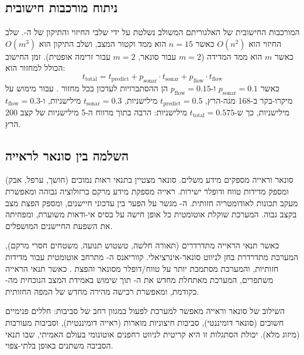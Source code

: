 \subsection{ניתוח מורכבות חישובית}
\label{sec:ch06_computational_complexity}

המורכבות החישובית של האלגוריתם המשולב נשלטת על ידי שלבי החיזוי והתיקון של ה-. שלב החיזוי הוא $O(n^2)$ כאשר $n=15$ הוא ממד וקטור המצב, ושלב התיקון הוא $O(m^3)$ כאשר $m$ הוא ממד המדידה ($m=2$ עבור סונאר, $m=2$ עבור זרימה אופטית). זמן החישוב הכולל למחזור הוא:
\begin{equation}
t_{\text{total}} = t_{\text{predict}} + p_{\text{sonar}} \cdot t_{\text{sonar}} + p_{\text{flow}} \cdot t_{\text{flow}}
\label{eq:ch06_computational_time}
\end{equation}
כאשר $p_{\text{sonar}} = 0.1$ ו-$p_{\text{flow}} = 0.15$ הן ההסתברויות לעדכון בכל מחזור . עבור מימוש על מיקרו-בקר  ב-168 מגה-הרץ, $t_{\text{predict}} = 0.5$ מילישניות, $t_{\text{sonar}} = 0.3$ מילישניות, ו-$t_{\text{flow}} = 0.3$ מילישניות, כך ש-$t_{\text{total}} = 0.575$ מילישניות: הרבה בתוך מרווח ה-5 מילישניות של קצב 200 הרץ.

\subsection{השלמה בין סונאר לראייה}
\label{sec:ch06_sonar_vision_complementarity}

סונאר וראייה מספקים מידע משלים. סונאר מצטיין בתנאי ראות נמוכים (חושך, ערפל, אבק) ומספק מדידות טווח ודופלר ישירות. ראייה מספקת מידע מרקם ברזולוציה גבוהה ומאפשרת מעקב תכונות לאודומטריה חזותית. ה- מגשר על הפער בין עדכוני חיישנים, ומספק הפצת מצב בקצב גבוה. המערכת שוקלת אוטומטית כל אופן חישה על בסיס אי-ודאות משוערת, ומפחיתה את השפעת החיישנים המושפלים.

כאשר תנאי הראייה מתדרדרים (תאורה חלשה, טשטוש תנועה, משטחים חסרי מרקם), המערכת מתדרדרת בחן לניווט סונאר-אינרציאלי. קווריאנס ה- מתרחב אוטומטית עבור מדידות חזותיות, והמערכת מסתמכת יותר על טווח/דופלר מסונאר והפצת . כאשר תנאי הראייה משתפרים, המערכת מאתחלת מחדש את ה- תוך שימוש באמידת המצב הנוכחית מה- כקודמת, ומאפשרת רכישה מהירה מחדש של המפה החזותית.

השילוב של סונאר וראייה מאפשר למערכת לפעול במגוון רחב של סביבות: חללים פנימיים חשוכים (סונאר דומיננטי), סביבות חיצוניות מוארות (ראייה דומיננטית), וסביבות מעורבות (מיזוג מלא). יכולת הסתגלות זו היא קריטית לניווט רחפנים אוטונומי בעולם האמיתי, שבו תנאי הסביבה משתנים באופן בלתי-צפוי.

